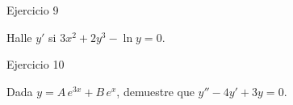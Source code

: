 \documentclass[aspectratio=169]{beamer}
\begin{document}
\begin{frame}{Ejercicio 9}
  \begin{mwejercicio}
    Halle $y'$ si $3x^{2} + 2y^{3} - \ln y = 0$.
  \end{mwejercicio}
  \vspace{3.5cm}
\end{frame}

\begin{frame}{Ejercicio 10}
  \begin{mwejercicio}
    Dada $y = A\,e^{3x} + B\,e^{x}$, demuestre que $y'' - 4y' + 3y = 0$.
  \end{mwejercicio}
  \vspace{3.5cm}
\end{frame}
\end{document}

